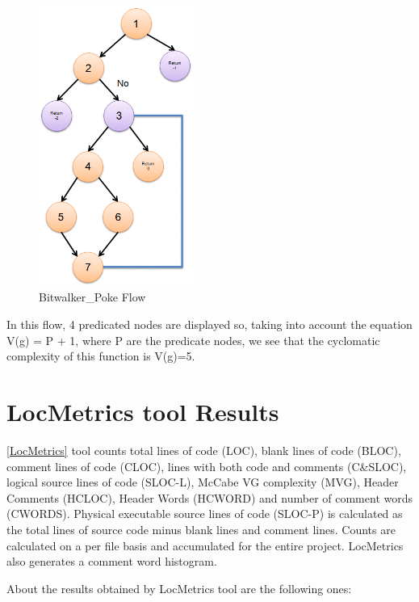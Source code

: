 \begin{figure}[H]
\centering
\includegraphics[width=0.45\textwidth]{./figures/flow.png}
\caption{Bitwalker\_Poke Flow}
\end{figure}

In this flow, 4 predicated nodes are displayed so, taking into account the equation V(g) = P + 1, where P are the predicate nodes, we see that the cyclomatic complexity of this function is V(g)=5.

\section{LocMetrics tool Results}

\href{http://www.locmetrics.com/}{[LocMetrics]} tool counts total lines of code (LOC), blank lines of code (BLOC), comment lines of code (CLOC), lines with both code and comments (C\&SLOC), logical source lines of code (SLOC-L), McCabe VG complexity (MVG), Header Comments (HCLOC), Header Words (HCWORD) and number of comment words (CWORDS). Physical executable source lines of code (SLOC-P) is calculated as the total lines of source code minus blank lines and comment lines. Counts are calculated on a per file basis and accumulated for the entire project. LocMetrics also generates a comment word histogram.

About the results obtained by LocMetrics tool are the following ones:

